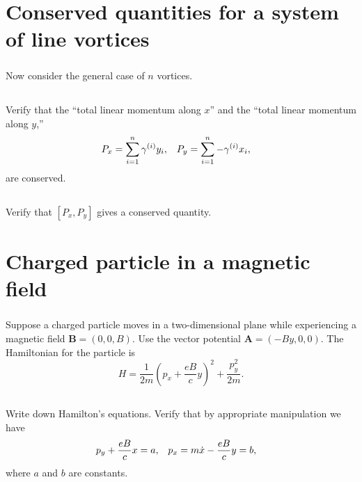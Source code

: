 \documentclass[11pt]{article}
\renewcommand{\vec}[1]{\mathbf{#1}}
\newcommand{\vfix}{\vspace{-\baselineskip}}
\newcommand{\beq}{\begin{equation*}}
\newcommand{\eeq}{\end{equation*}}
\newenvironment{statement}[1]
{
	\section{#1}
	\color{darkgray}
	\ignorespaces
}
{
}
\newenvironment{problem}
{
	\subsection{}
	\color{darkgray}
    \ignorespaces
}
{

}
\begin{document}











\newcommand{\Px}{P_x}
\newcommand{\Py}{P_y}

\clearpage
\begin{statement}{Conserved quantities for a system of line vortices} \label{vort2}
\subparagraph{}
	Now consider the general case of $n$ vortices.
\end{statement}

\begin{problem}
	Verify that the ``total linear momentum along $x$'' and the ``total linear momentum along $y$,''
	\begin{align*}
		\Px &= \sum_{i = 1}^n \gami \yi, &
		\Py &= \sum_{i = 1}^n -\gami \xi,
	\end{align*}
	are conserved.
\end{problem}

\begin{problem}
	Verify that $[\Px, \Py]$ gives a conserved quantity.
\end{problem}


\newcommand{\vB}{\vec{B}}
\newcommand{\vA}{\vec{A}}
\newcommand{\px}{p_x}
\newcommand{\py}{p_y}
\newcommand{\pdx}{\dot{p}_x}
\newcommand{\pdy}{\dot{p}_y}

\begin{statement}{Charged particle in a magnetic field}
\subparagraph{}
	Suppose a charged particle moves in a two-dimensional plane while experiencing a magnetic field $\vB = (0, 0, B)$.  Use the vector potential $\vA = (-By, 0, 0)$.  The Hamiltonian for the particle is
	\beq
		H = \frac{1}{2m} \left( \px + \frac{e B}{c} y \right)^2 + \frac{\py^2}{2m}.
	\eeq
\vfix
\end{statement}

\begin{problem}
	Write down Hamilton's equations.  Verify that by appropriate manipulation we have
	\begin{align*}
		\py + \frac{e B}{c} x &= a, &
		\px &= m \xd - \frac{e B}{c} y = b,
	\end{align*}
	where $a$ and $b$ are constants.
\end{problem}
\end{document}
